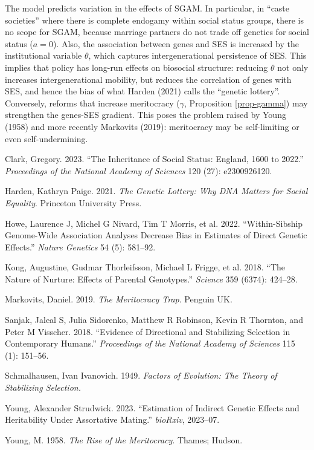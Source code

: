 \documentclass[
]{article}
\newlength{\cslhangindent}
\newenvironment{CSLReferences}[2] %
 {\begin{list}{}{%
  \setlength{\itemindent}{0pt}
  \setlength{\leftmargin}{0pt}
  \setlength{\parsep}{0pt}
  \ifodd #1
   \setlength{\leftmargin}{\cslhangindent}
   \setlength{\itemindent}{-1\cslhangindent}
  \fi
  \setlength{\itemsep}{#2\baselineskip}}}
 {\end{list}}
\theoremstyle{definition}
\theoremstyle{definition}
\theoremstyle{definition}
\theoremstyle{definition}
\theoremstyle{remark}
\begin{document}
The model predicts variation in the effects of SGAM. In particular, in
``caste societies'' where there is complete endogamy within social status
groups, there is no scope for SGAM, because marriage partners do not trade off
genetics for social status (\(a = 0\)). Also, the association between genes and
SES is increased by the institutional variable \(\theta\), which captures
intergenerational persistence of SES. This implies that policy has long-run
effects on biosocial structure: reducing \(\theta\) not only increases
intergenerational mobility, but reduces the correlation of genes with SES, and
hence the bias of what Harden (2021) calls the ``genetic lottery''.
Conversely, reforms that increase meritocracy (\(\gamma\), Proposition
\ref{prop-gamma}) may strengthen the genes-SES gradient. This poses the problem
raised by Young (1958) and more recently Markovits (2019): meritocracy
may be self-limiting or even self-undermining.

\protect{}\label{refs}
\begin{CSLReferences}{1}{1}
Clark, Gregory. 2023. {``The Inheritance of Social Status: England, 1600 to 2022.''} \emph{Proceedings of the National Academy of Sciences} 120 (27): e2300926120.

Harden, Kathryn Paige. 2021. \emph{The Genetic Lottery: Why DNA Matters for Social Equality}. Princeton University Press.

{Howe, Laurence J, Michel G Nivard, Tim T Morris, et al.} 2022. {``Within-Sibship Genome-Wide Association Analyses Decrease Bias in Estimates of Direct Genetic Effects.''} \emph{Nature Genetics} 54 (5): 581--92.

{Kong, Augustine, Gudmar Thorleifsson, Michael L Frigge, et al.} 2018. {``The Nature of Nurture: Effects of Parental Genotypes.''} \emph{Science} 359 (6374): 424--28.

Markovits, Daniel. 2019. \emph{The Meritocracy Trap}. Penguin UK.

Sanjak, Jaleal S, Julia Sidorenko, Matthew R Robinson, Kevin R Thornton, and Peter M Visscher. 2018. {``Evidence of Directional and Stabilizing Selection in Contemporary Humans.''} \emph{Proceedings of the National Academy of Sciences} 115 (1): 151--56.

Schmalhausen, Ivan Ivanovich. 1949. \emph{Factors of Evolution: The Theory of Stabilizing Selection.}

Young, Alexander Strudwick. 2023. {``Estimation of Indirect Genetic Effects and Heritability Under Assortative Mating.''} \emph{bioRxiv}, 2023--07.

Young, M. 1958. \emph{The Rise of the Meritocracy}. Thames; Hudson.

\end{CSLReferences}
\end{document}

